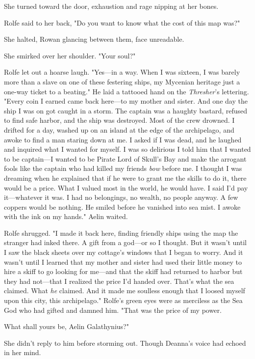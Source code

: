 She turned toward the door, exhaustion and rage nipping at her bones.

Rolfe said to her back, "Do you want to know what the cost of this map was?"

She halted, Rowan glancing between them, face unreadable.

She smirked over her shoulder. "Your soul?"

Rolfe let out a hoarse laugh. "Yes---in a way. When I was sixteen, I was barely more than a slave on one of these festering ships, my Mycenian heritage just a one-way ticket to a beating." He laid a tattooed hand on the \emph{Thresher}'s lettering. "Every coin I earned came back here---to my mother and sister. And one day the ship I was on got caught in a storm. The captain was a haughty bastard, refused to find safe harbor, and the ship was destroyed. Most of the crew drowned. I drifted for a day, washed up on an island at the edge of the archipelago, and awoke to find a man staring down at me. I asked if I was dead, and he laughed and inquired what I wanted for myself. I was so delirious I told him that I wanted to be captain---I wanted to be Pirate Lord of Skull's Bay and make the arrogant fools like the captain who had killed my friends \emph{bow} before me. I thought I was dreaming when he explained that if he were to grant me the skills to do it, there would be a price. What I valued most in the world, he would have. I said I'd pay it---whatever it was. I had no belongings, no wealth, no people anyway. A few coppers would be nothing. He smiled before he vanished into sea mist. I awoke with the ink on my hands." Aelin waited.

Rolfe shrugged. "I made it back here, finding friendly ships using the map the stranger had inked there. A gift from a god---or so I thought. But it wasn't until I saw the black sheets over my cottage's windows that I began to worry. And it wasn't until I learned that my mother and sister had used their little money to hire a skiff to go looking for me---and that the skiff had returned to harbor but they had not---that I realized the price I'd handed over. That's what the sea claimed. What
\emph{he} claimed. And it made me soulless enough that I loosed myself upon this city, this archipelago." Rolfe's green eyes were as merciless as the Sea God who had gifted and damned him. "That was the price of my power.

What shall yours be, Aelin Galathynius?"

She didn't reply to him before storming out. Though Deanna's voice had echoed in her mind.

